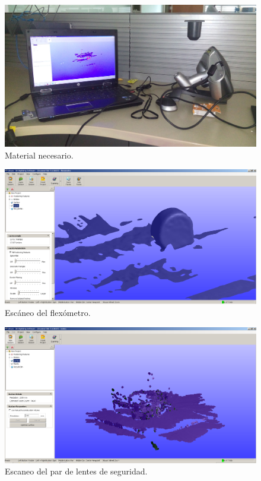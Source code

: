  \begin{figure}[!htbp]
 \centering
 \includegraphics [scale=0.1]
 {./img/20160502_180551.jpg}
  \caption{Material necesario.}
 \end{figure}

  \begin{figure}[!htbp]
 \centering
 \includegraphics [scale=0.3]
 {./img/flexo_GUI.png}
  \caption{Esc\'aneo del flex\'ometro.}
 \end{figure}

  \begin{figure}[!htbp]
 \centering
 \includegraphics [scale=0.3]
 {./img/lentes_gui.png}
  \caption{Escaneo del par de lentes de seguridad.}
 \end{figure}

 \pagebreak
